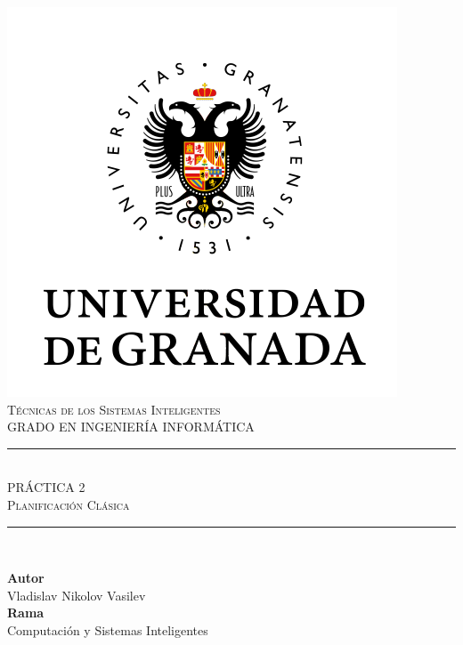 \documentclass[11pt,a4paper]{article}
\newcommand{\asignatura}{Técnicas de los Sistemas Inteligentes}
\newcommand{\autor}{Vladislav Nikolov Vasilev}
\begin{document}

\begin{titlepage}

\begin{minipage}{\textwidth}

\centering

\includegraphics[scale=0.5]{img/ugr.png}\\

\textsc{\Large \asignatura{}\\[0.2cm]}
\textsc{GRADO EN INGENIERÍA INFORMÁTICA}\\[1cm]

\noindent\rule[-1ex]{\textwidth}{1pt}\\[1.5ex]
\textsc{{\Huge PRÁCTICA 2\\[0.5ex]}}
\textsc{{\Large Planificación Clásica\\}}
\noindent\rule[-1ex]{\textwidth}{2pt}\\[3.5ex]

\end{minipage}

\vspace{0.5cm}

\begin{minipage}{\textwidth}

\centering

\textbf{Autor}\\ {\autor{}}\\[2.5ex]
\textbf{Rama}\\ {Computación y Sistemas Inteligentes}\\[2.5ex]
\vspace{0.3cm}


\end{minipage}
\end{titlepage}
\end{document}
